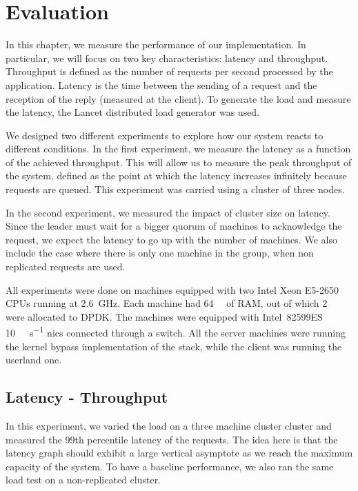 \chapter{Evaluation}
\label{chap:evaluation}

In this chapter, we measure the performance of our implementation.
In particular, we will focus on two key characteristics: latency and throughput.
Throughput is defined as the number of requests per second processed by the application.
Latency is the time between the sending of a request and the reception of the reply (measured at the client).
To generate the load and measure the latency, the Lancet distributed load generator\cite{lancet} was used.

We designed two different experiments to explore how our system reacts to different conditions.
In the first experiment, we measure the latency as a function of the achieved throughput.
This will allow us to measure the peak throughput of the system, defined as the point at which the latency increases infinitely because requests are queued.
This experiment was carried using a cluster of three nodes.

In the second experiment, we measured the impact of cluster size on latency.
Since the leader must wait for a bigger quorum of machines to acknowledge the request, we expect the latency to go up with the number of machines.
We also include the case where there is only one machine in the group, \ie when non replicated requests are used.

All experiments were done on machines equipped with two Intel Xeon E5-2650 CPUs running at \SI{2.6}{\giga\hertz}.
Each machine had \SI{64}{\giga\byte} of RAM, out of which \SI{2}{\giga\byte} were allocated to DPDK.
The machines were equipped with Intel~82599ES \SI{10}{\giga\bit\per\second} \glspl{nic} connected through a switch.
All the server machines were running the kernel bypass implementation of the stack, while the client was running the userland one.

\section{Latency - Throughput}
\label{sec:latency_throughput}

In this experiment, we varied the load on a three machine cluster cluster and measured the 99th percentile latency of the requests.
The idea here is that the latency graph should exhibit a large vertical asymptote as we reach the maximum capacity of the system. 
To have a baseline performance, we also ran the same load test on a non-replicated cluster.


